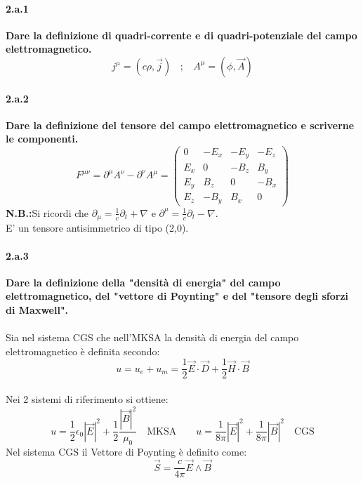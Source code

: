 \documentclass[twoside]{article}
\begin{document}
\paragraph{2.a.1}\textbf{Dare la definizione di quadri-corrente e di quadri-potenziale del campo
elettromagnetico.}\\ 
\begin{equation*}
    j^{\mu}=(c\rho,\vec{j}) \ \ \ \ ; \ \ \ \ A^{\mu}=(\phi,\vec{A})
\end{equation*}

\paragraph{2.a.2}\textbf{Dare la definizione del tensore del campo elettromagnetico e scriverne le
componenti.}\\ 
\begin{equation*}
    F^{\mu \nu}=\partial^{\mu}A^{\nu}-\partial^{\nu}A^{\mu}=\begin{pmatrix}
    0 & -E_x & -E_y & - E_z \\
    E_x & 0 & -B_z & B_y \\
    E_y & B_z & 0 & -B_x \\
    E_z & -B_y & B_x & 0
    \end{pmatrix}
\end{equation*}
\textbf{N.B.:}Si ricordi che $\partial_\mu=\frac{1}{c}\partial_t+\nabla$ e $\partial^\mu=\frac{1}{c}\partial_t-\nabla$.\\
E' un tensore antisimmetrico di tipo (2,0).
\paragraph{2.a.3}\textbf{Dare la definizione della "densità di energia" del campo elettromagnetico, del
"vettore di Poynting" e del "tensore degli sforzi di Maxwell".
}\\ \\
Sia nel sistema CGS che nell'MKSA la densità di energia del campo elettromagnetico è definita secondo:
\begin{equation*}
    u=u_e+u_m=\frac{1}{2}\vec{E}\cdot\vec{D}+\frac{1}{2}\vec{H}\cdot \vec{B} 
\end{equation*}
\\
Nei 2 sistemi di riferimento si ottiene:
\begin{equation}
    u=\frac{1}{2}\epsilon_0 |\vec{E}|^2+\frac{1}{2}\frac{|\vec{B}|^2}{\mu_0}
    \quad \text{MKSA} \qquad u=\frac{1}{8\pi}|\vec{E}|^2+\frac{1}{8\pi}|\vec{B}|^2 \quad \text{CGS}
\end{equation}
Nel sistema CGS il Vettore di Poynting è definito come:
\begin{equation*}
    \vec{S}=\frac{c}{4\pi}\vec{E}\wedge \vec{B}
\end{equation*}
\end{document}
